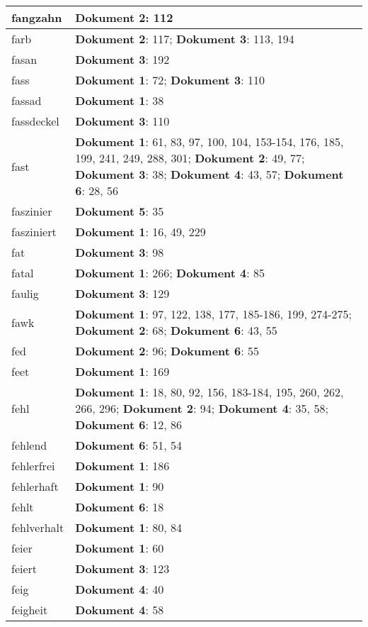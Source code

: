 \documentclass[a5paper]{article}
\begin{document}
\begin{longtable}[l]{|l|p{3in}|}
\hline
fangzahn & \textbf{Dokument 2}: 112 \\
\hline
farb & \textbf{Dokument 2}: 117; \textbf{Dokument 3}: 113, 194 \\
\hline
fasan & \textbf{Dokument 3}: 192 \\
\hline
fass & \textbf{Dokument 1}: 72; \textbf{Dokument 3}: 110 \\
\hline
fassad & \textbf{Dokument 1}: 38 \\
\hline
fassdeckel & \textbf{Dokument 3}: 110 \\
\hline
fast & \textbf{Dokument 1}: 61, 83, 97, 100, 104, 153-154, 176, 185, 199, 241, 249, 288, 301; \textbf{Dokument 2}: 49, 77; \textbf{Dokument 3}: 38; \textbf{Dokument 4}: 43, 57; \textbf{Dokument 6}: 28, 56 \\
\hline
faszinier & \textbf{Dokument 5}: 35 \\
\hline
fasziniert & \textbf{Dokument 1}: 16, 49, 229 \\
\hline
fat & \textbf{Dokument 3}: 98 \\
\hline
fatal & \textbf{Dokument 1}: 266; \textbf{Dokument 4}: 85 \\
\hline
faulig & \textbf{Dokument 3}: 129 \\
\hline
fawk & \textbf{Dokument 1}: 97, 122, 138, 177, 185-186, 199, 274-275; \textbf{Dokument 2}: 68; \textbf{Dokument 6}: 43, 55 \\
\hline
fed & \textbf{Dokument 2}: 96; \textbf{Dokument 6}: 55 \\
\hline
feet & \textbf{Dokument 1}: 169 \\
\hline
fehl & \textbf{Dokument 1}: 18, 80, 92, 156, 183-184, 195, 260, 262, 266, 296; \textbf{Dokument 2}: 94; \textbf{Dokument 4}: 35, 58; \textbf{Dokument 6}: 12, 86 \\
\hline
fehlend & \textbf{Dokument 6}: 51, 54 \\
\hline
fehlerfrei & \textbf{Dokument 1}: 186 \\
\hline
fehlerhaft & \textbf{Dokument 1}: 90 \\
\hline
fehlt & \textbf{Dokument 6}: 18 \\
\hline
fehlverhalt & \textbf{Dokument 1}: 80, 84 \\
\hline
feier & \textbf{Dokument 1}: 60 \\
\hline
feiert & \textbf{Dokument 3}: 123 \\
\hline
feig & \textbf{Dokument 4}: 40 \\
\hline
feigheit & \textbf{Dokument 4}: 58 \\

\end{longtable}
\end{document}

